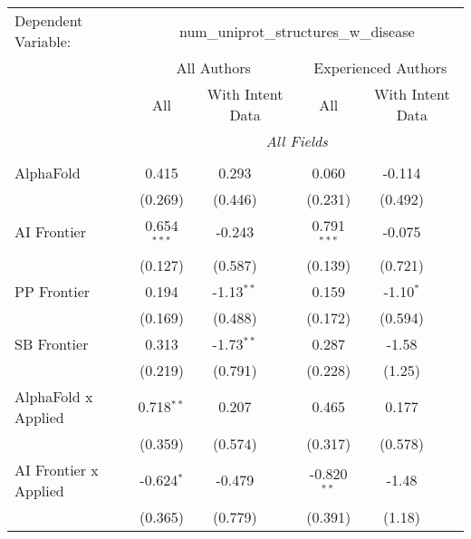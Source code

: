 \begingroup
\centering
\begin{tabular}{lcccccc}
   \tabularnewline \midrule \midrule
   Dependent Variable: & \multicolumn{6}{c}{num\_uniprot\_structures\_w\_disease}\\
 & \multicolumn{3}{c}{All Authors} & \multicolumn{3}{c}{Experienced Authors} \\
\cmidrule(lr){2-4} \cmidrule(lr){5-7}
 & \multicolumn{1}{c}{All} & \multicolumn{2}{c}{With Intent Data} & \multicolumn{1}{c}{All} & \multicolumn{2}{c}{With Intent Data} \\
\cmidrule(lr){2-2} \cmidrule(lr){3-4} \cmidrule(lr){5-5} \cmidrule(lr){6-7}
 & \multicolumn{6}{c}{\textit{All Fields}} \\ \\
   AlphaFold                      & 0.415         & 0.293        &               & 0.060         & -0.114      &   \\   
                                  & (0.269)       & (0.446)      &               & (0.231)       & (0.492)     &   \\   
   AI Frontier                    & 0.654$^{***}$ & -0.243       &               & 0.791$^{***}$ & -0.075      &   \\   
                                  & (0.127)       & (0.587)      &               & (0.139)       & (0.721)     &   \\   
   PP Frontier                    & 0.194         & -1.13$^{**}$ &               & 0.159         & -1.10$^{*}$ &   \\   
                                  & (0.169)       & (0.488)      &               & (0.172)       & (0.594)     &   \\   
   SB Frontier                    & 0.313         & -1.73$^{**}$ &               & 0.287         & -1.58       &   \\   
                                  & (0.219)       & (0.791)      &               & (0.228)       & (1.25)      &   \\   
   AlphaFold x Applied            & 0.718$^{**}$  & 0.207        &               & 0.465         & 0.177       &   \\   
                                  & (0.359)       & (0.574)      &               & (0.317)       & (0.578)     &   \\   
   AI Frontier x Applied          & -0.624$^{*}$  & -0.479       &               & -0.820$^{**}$ & -1.48       &   \\   
                                  & (0.365)       & (0.779)      &               & (0.391)       & (1.18)      &   \\   

\end{tabular}
